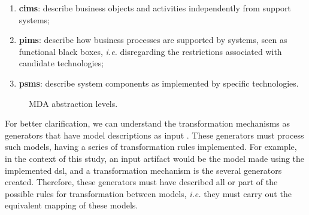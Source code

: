 \begin{enumerate}
     \item \textbf{\acp{cim}}: describe business objects and activities independently from support systems;
     \item \textbf{\acp{pim}}: describe how business processes are supported by systems, seen as functional black boxes, \textit{i.e.} disregarding the restrictions associated with candidate technologies;
     \item \textbf{\acp{psm}}: describe system components as implemented by specific technologies.
\end{enumerate}

\begin{figure}[!htb]
    \centering
    \caption{MDA abstraction levels.}
    
    \label{fig:MDA}
\end{figure}

For better clarification, we can understand the transformation mechanisms as generators that have model descriptions as input \cite{Hutchinson:2011}.
These generators must process such models, having a series of transformation rules implemented.
For example, in the context of this study, an input artifact would be the model made using the implemented \ac{dsl}, and a transformation mechanism is the several generators created.
Therefore, these generators must have described all or part of the possible rules for transformation between models, \textit{i.e.} they must carry out the equivalent mapping of these models.

